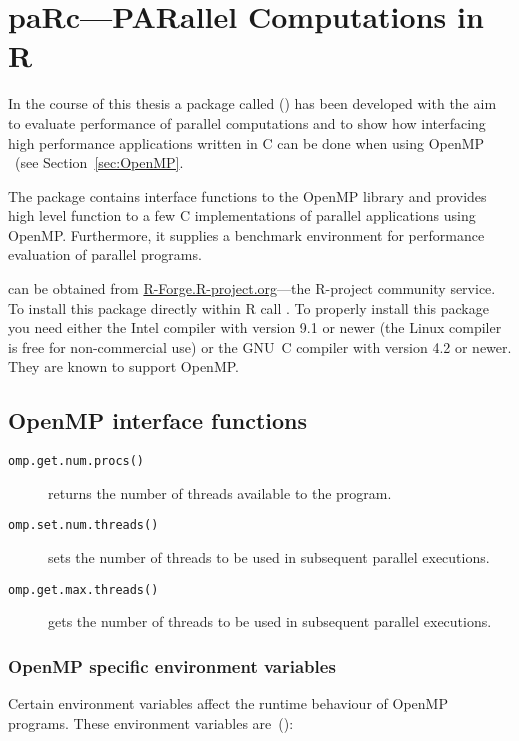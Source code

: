 \section{paRc---PARallel Computations in R}
\label{sec:paRc}

In the course of this thesis a package called 
(\cite{theussl07paRc}) has been developed with the aim
to evaluate performance of parallel computations and to show how
interfacing high performance applications written in C can be done
when using OpenMP ~(see Section~\ref{sec:OpenMP}.

The package  contains interface functions to the OpenMP library
and provides high level function to a few C implementations of
parallel applications using OpenMP.
Furthermore, it supplies a benchmark environment for performance
evaluation of parallel programs.

 can be obtained from \url{R-Forge.R-project.org}---the
R-project community service. To install this package directly within R
call .
To properly install this package you need either the Intel compiler
with version 9.1 or newer (the Linux compiler is free for
non-commercial use) or the GNU~C compiler with version 4.2 or
newer. They are known to support OpenMP.

\subsection{OpenMP interface functions}

\begin{description}
\item[\texttt{omp.get.num.procs()}] returns the number of threads
  available to the program.
\item[\texttt{omp.set.num.threads()}] sets the number of threads to be
  used in subsequent parallel executions.
\item[\texttt{omp.get.max.threads()}] gets the number of threads to be
  used in subsequent parallel executions.
\end{description}


\subsubsection{OpenMP specific environment variables}

Certain environment variables affect the runtime behaviour of OpenMP
programs. These environment variables are~(\cite{openMP05}):

